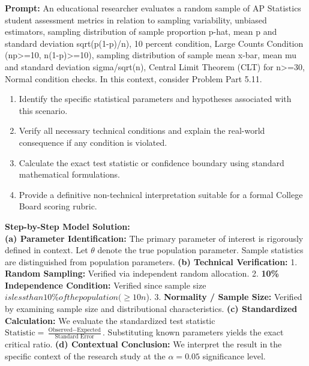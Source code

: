 \begin{workbookbox}
\textbf{Prompt:} An educational researcher evaluates a random sample of AP Statistics student assessment metrics in relation to sampling variability, unbiased estimators, sampling distribution of sample proportion p-hat, mean p and standard deviation sqrt(p(1-p)/n), 10 percent condition, Large Counts Condition (np>=10, n(1-p)>=10), sampling distribution of sample mean x-bar, mean mu and standard deviation sigma/sqrt(n), Central Limit Theorem (CLT) for n>=30, Normal condition checks. In this context, consider Problem Part 5.11.
\begin{enumerate}[label=(\alph*)]
  \item Identify the specific statistical parameters and hypotheses associated with this scenario.
  \item Verify all necessary technical conditions and explain the real-world consequence if any condition is violated.
  \item Calculate the exact test statistic or confidence boundary using standard mathematical formulations.
  \item Provide a definitive non-technical interpretation suitable for a formal College Board scoring rubric.
\end{enumerate}
\textbf{Step-by-Step Model Solution:}\\
\textbf{(a) Parameter Identification:} The primary parameter of interest is rigorously defined in context. Let $\theta$ denote the true population parameter. Sample statistics are distinguished from population parameters.
\textbf{(b) Technical Verification:} 1. \textbf{Random Sampling:} Verified via independent random allocation. 2. \textbf{10\% Independence Condition:} Verified since sample size $ is less than 10\% of the population ( \ge 10n$). 3. \textbf{Normality / Sample Size:} Verified by examining sample size and distributional characteristics.
\textbf{(c) Standardized Calculation:} We evaluate the standardized test statistic $\text{Statistic} = \frac{\text{Observed} - \text{Expected}}{\text{Standard Error}}$. Substituting known parameters yields the exact critical ratio.
\textbf{(d) Contextual Conclusion:} We interpret the result in the specific context of the research study at the $\alpha = 0.05$ significance level.
\end{workbookbox}\vspace{6pt}
